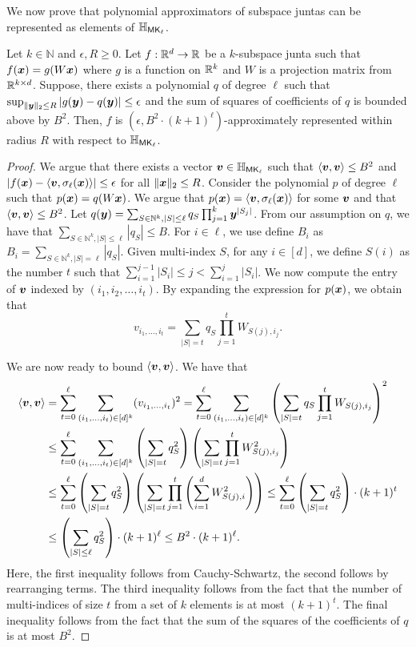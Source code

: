 We now prove that polynomial approximators of subspace juntas can be represented as elements of ${\mathbb{H}}_{\mathsf{MK}_{\ell}}$.
\begin{lemma}
\label{lem:subspace_junta_kernel}
    Let $k\in \mathbb{N}$ and $\epsilon, R\geq 0$.  Let $f:\mathbb{R}^{d}\to \mathbb{R}$ be a $k$-subspace junta such that $f({\bm{x}})=g(W{\bm{x}})$ where $g$ is a function on $\mathbb{R}^{k}$ and $W$ is a projection matrix from $\mathbb{R}^{k\times d}$. Suppose, there exists a polynomial $q$ of degree $\ell$ such that $\sup_{\|{\bm{y}}\|_{2}\leq R}|g({\bm{y}})-q({\bm{y}})|\leq \epsilon$ and the sum of squares of coefficients of $q$ is bounded above by $B^2$. Then, $f$ is $(\epsilon, B^2\cdot (k+1)^{\ell})$-approximately represented within radius $R$ with respect to ${\mathbb{H}}_{\mathsf{MK}_{\ell}}$.
\end{lemma}
\begin{proof}
    We argue that there exists a vector ${\bm{v}}\in {\mathbb{H}}_{\mathsf{MK}_{\ell}}$ such that $\langle{\bm{v}},{\bm{v}}\rangle\leq B^2$ and $|f({\bm{x}})-\langle {\bm{v}},\sigma_{\ell}({\bm{x}})\rangle|\leq \epsilon$ for all $\|{\bm{x}}\|_{2}\leq R$. Consider the polynomial $p$ of degree $\ell$ such that $p({\bm{x}})=q(W{\bm{x}})$. We argue that $p({\bm{x}})=\langle {\bm{v}},\sigma_{\ell}({\bm{x}})\rangle$ for some ${\bm{v}}$ and that $\langle{\bm{v}},{\bm{v}}\rangle\leq B^2$. Let $q({\bm{y}})=\sum_{S\in \mathbb{N}^{k},|S|\leq \ell}q_{S}\prod_{j=1}^{k}{\bm{y}}^{|S_j|}$. From our assumption on $q$, we have that $\sum_{S\in \mathbb{N}^{k},|S|\leq \ell}|q_{S}|\leq B$. For $i\in \ell$, we use define $B_i$ as $B_i=\sum_{S\in \mathbb{N}^{k},|S|=\ell}|q_{S}|$. Given multi-index $S$, for any $i\in [d]$, we define $S(i)$ as the number $t$  such that $\sum_{i=1}^{j-1}|S_i|\leq j< \sum_{i=1}^{j}|S_i|$. We now compute the entry of ${\bm{v}}$ indexed by $(i_1,i_2,\ldots,i_t)$. By expanding the expression for $p({\bm{x}})$, we obtain that 
    \[v_{i_1,\ldots,i_t}=\sum_{|S|=t}q_{S}\prod_{j=1}^{t}W_{S(j),i_j}.\]

    We are now ready to bound $\langle{\bm{v}},{\bm{v}}\rangle$. We have that 
    \begin{align*}
\langle{\bm{v}},{\bm{v}}\rangle&=\sum_{t=0}^{\ell}\sum_{(i_1,\ldots,i_t)\in [d]^{k}}(v_{i_1,\ldots,i_t})^2
    =\sum_{t=0}^{\ell}\sum_{(i_1,\ldots,i_t)\in [d]^k}\left(\sum_{|S|=t}q_{S}\prod_{j=1}^{t}W_{S(j),i_j}\right)^2\\
    &\leq \sum_{t=0}^{\ell}\sum_{(i_1,\ldots,i_t)\in [d]^k}\left(\sum_{|S|=t}q^2_{S}\right)\left(\sum_{|S|=t}\prod_{j=1}^{t}W^2_{S(j),i_j}\right)\\
    &\leq \sum_{t=0}^{\ell}\left(\sum_{|S|=t}q^2_{S}\right)\left(\sum_{|S|=t}\prod_{j=1}^{t}\left(\sum_{i=1}^{d}W^2_{S(j),i}\right)\right)\leq \sum_{t=0}^{\ell}\left(\sum_{|S|=t}q^2_{S}\right)\cdot (k+1)^{t}
    \\  &\leq\left(\sum_{|S|\leq \ell}q^2_{S}\right)\cdot (k+1)^{\ell}\leq B^2\cdot (k+1)^{\ell}.
    \end{align*}
Here, the first inequality follows from Cauchy-Schwartz, the second follows by rearranging terms. The third inequality follows from the fact that the number of multi-indices of size $t$ from a set of $k$ elements is at most $(k+1)^{t}$. The final inequality follows from the fact that the sum of the squares of the coefficients of $q$ is at most $B^2$.
\end{proof}


